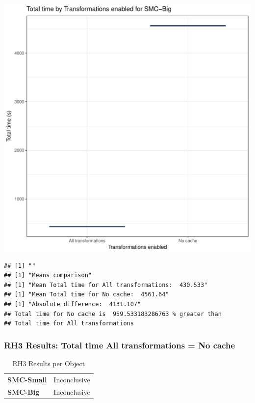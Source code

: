 \documentclass{article}\usepackage[]{graphicx}\usepackage[]{color}
\makeatletter
\def\maxwidth{ %
  \ifdim\Gin@nat@width>\linewidth
    \linewidth
  \else
    \Gin@nat@width
  \fi
}
\newenvironment{kframe}{%
 \def\at@end@of@kframe{}%
 \ifinner\ifhmode%
  \def\at@end@of@kframe{\end{minipage}}%
  \begin{minipage}{\columnwidth}%
 \fi\fi%
 \def\FrameCommand##1{\hskip\@totalleftmargin \hskip-\fboxsep
 \colorbox{shadecolor}{##1}\hskip-\fboxsep
     \hskip-\linewidth \hskip-\@totalleftmargin \hskip\columnwidth}%
 \MakeFramed {\advance\hsize-\width
   \@totalleftmargin\z@ \linewidth\hsize
   \@setminipage}}%
 {\par\unskip\endMakeFramed%
 \at@end@of@kframe}
\newenvironment{knitrout}{}{} %
\makeatother
\begin{document}
\begin{knitrout}
\color{fgcolor}
\includegraphics[width=\maxwidth]{figure/RH3_big-1} 
\begin{kframe}

{\ttfamily\noindent\bfseries\color{errorcolor}{\#\# Error in eval(expr, envir, enclos): object 'shap\_cashew\_big' not found}}\begin{verbatim}
## [1] ""
## [1] "Means comparison"
## [1] "Mean Total time for All transformations:  430.533"
## [1] "Mean Total time for No cache:  4561.64"
## [1] "Absolute difference:  4131.107"
## Total time for No cache is  959.533183286763 % greater than 
## Total time for All transformations
\end{verbatim}
\end{kframe}
\end{knitrout}


 

	
	\subsubsection{RH3 Results: Total time All transformations = No cache}
	
	
	\begin{table}[H]
	\centering
	\caption{RH3 Results per Object}
	\begin{tabular}{ll}
	\textbf{SMC-Small} & Inconclusive \\
	\textbf{SMC-Big} & Inconclusive \\
	\end{tabular}
	\end{table}
\end{document}
